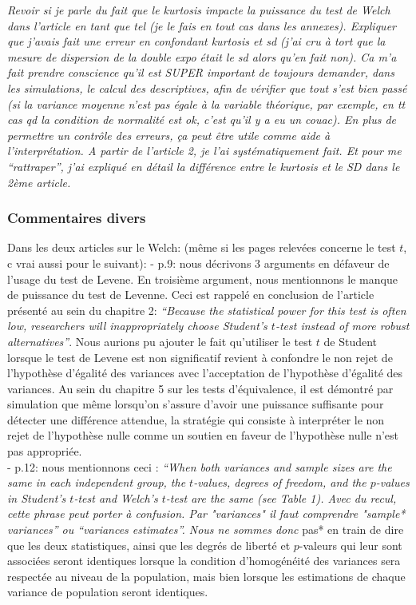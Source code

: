 \documentclass[
  12pt,
  french,
]{article}
\begin{document}
\emph{Revoir si je parle du fait que le kurtosis impacte la puissance du
test de Welch dans l'article en tant que tel (je le fais en tout cas
dans les annexes). Expliquer que j'avais fait une erreur en confondant
kurtosis et sd (j'ai cru à tort que la mesure de dispersion de la double
expo était le sd alors qu'en fait non). Ca m'a fait prendre conscience
qu'il est SUPER important de toujours demander, dans les simulations, le
calcul des descriptives, afin de vérifier que tout s'est bien passé (si
la variance moyenne n'est pas égale à la variable théorique, par
exemple, en tt cas qd la condition de normalité est ok, c'est qu'il y a
eu un couac). En plus de permettre un contrôle des erreurs, ça peut être
utile comme aide à l'interprétation. A partir de l'article 2, je l'ai
systématiquement fait. Et pour me ``rattraper'', j'ai expliqué en détail
la différence entre le kurtosis et le SD dans le 2ème article.}

\hypertarget{commentaires-divers}{%
\subsubsection{Commentaires divers}\label{commentaires-divers}}

Dans les deux articles sur le Welch: (même si les pages relevées
concerne le test \(t\), c vrai aussi pour le suivant): - p.9: nous
décrivons 3 arguments en défaveur de l'usage du test de Levene. En
troisième argument, nous mentionnons le manque de puissance du test de
Levenne. Ceci est rappelé en conclusion de l'article présenté au sein du
chapitre 2: \emph{``Because the statistical power for this test is often
low, researchers will inappropriately choose Student's \(t\)-test
instead of more robust alternatives''}. Nous aurions pu ajouter le fait
qu'utiliser le test \(t\) de Student lorsque le test de Levene est non
significatif revient à confondre le non rejet de l'hypothèse d'égalité
des variances avec l'acceptation de l'hypothèse d'égalité des variances.
Au sein du chapitre 5 sur les tests d'équivalence, il est démontré par
simulation que même lorsqu'on s'assure d'avoir une puissance suffisante
pour détecter une différence attendue, la stratégie qui consiste à
interpréter le non rejet de l'hypothèse nulle comme un soutien en faveur
de l'hypothèse nulle n'est pas appropriée.\\
- p.12: nous mentionnons ceci : \emph{``When both variances and sample
sizes are the same in each independent group, the \(t\)-values, degrees
of freedom, and the \(p\)-values in Student's \(t\)-test and Welch's
\(t\)-test are the same (see Table 1)\emph{. Avec du recul, cette phrase
peut porter à confusion. Par "variances" il faut comprendre "}sample*
variances'' ou ``variances \emph{estimates}''. Nous ne sommes donc }pas*
en train de dire que les deux statistiques, ainsi que les degrés de
liberté et \(p\)-valeurs qui leur sont associées seront identiques
lorsque la condition d'homogénéité des variances sera respectée au
niveau de la population, mais bien lorsque les estimations de chaque
variance de population seront identiques.
\end{document}
